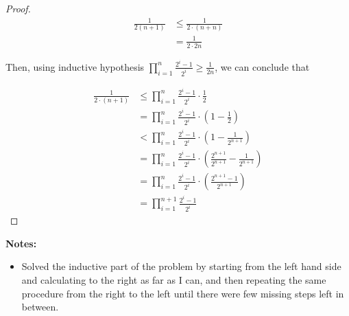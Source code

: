 \documentclass[12pt]{article}
\begin{document}
\begin{itemize}
\begin{proof}
        \begin{align}
            \frac{1}{2(n+1)} &\leq \frac{1}{2 \cdot (n+n)}\\
            &= \frac{1}{2 \cdot 2n}
        \end{align}

        \bigskip

        Then, using inductive hypothesis $\prod\limits_{i=1}^n \frac{2^i - 1}{2^i}
        \geq \frac{1}{2n}$, we can conclude that

        \begin{align}
            \frac{1}{2 \cdot (n+1)} &\leq \prod\limits_{i=1}^n \frac{2^i - 1}{2^i} \cdot \frac{1}{2}\\
            &= \prod\limits_{i=1}^n \frac{2^i - 1}{2^i} \cdot \left( 1 - \frac{1}{2} \right)\\
            &< \prod\limits_{i=1}^n \frac{2^i - 1}{2^i} \cdot \left( 1 - \frac{1}{2^{n+1}} \right)\\
            &= \prod\limits_{i=1}^n \frac{2^i - 1}{2^i} \cdot \left( \frac{2^{n+1}}{2^{n+1}} - \frac{1}{2^{n+1}} \right)\\
            &= \prod\limits_{i=1}^n \frac{2^i - 1}{2^i} \cdot \left( \frac{2^{n+1} - 1}{2^{n+1}} \right)\\
            &= \prod\limits_{i=1}^{n+1} \frac{2^i - 1}{2^i}
        \end{align}
    \end{proof}

    \bigskip

    \textbf{Notes:}

    \begin{itemize}
        \item Solved the inductive part of the problem by starting from the left
        hand side and calculating to the right as far as I can, and then repeating
        the same procedure from the right to the left until there were few missing
        steps left in between.
    \end{itemize}


\end{itemize}
\end{document}
